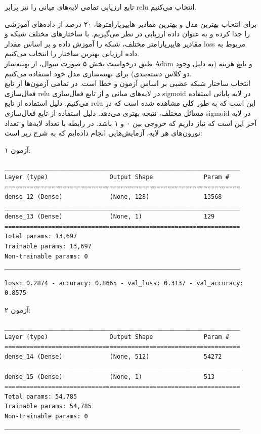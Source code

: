 \documentclass{article}
\begin{document}
تابع ارزیابی تمامی لایه‌های میانی را نیز برابر relu انتخاب می‌کنیم.

برای انتخاب بهترین مدل و بهترین مقادیر هایپرپارامترها، ۲۰ درصد از داده‌های آموزشی را جدا کرده و به عنوان داده ارزیابی در نظر می‌گیریم. با ساختارهای مختلف شبکه و مقادیر هایپرپارامتر مختلف، شبکه را آموزش داده و بر اساس مقدار  loss مربوط به داده ارزیابی بهترین ساختار را انتخاب می‌کنیم. \\

طبق درخواست بخش ۵ صورت سوال، از بهینه‌ساز Adam و تابع هزینه  (به دلیل وجود دو کلاس دسته‌بندی) برای بهینه‌سازی مدل خود استفاده می‌کنیم. \\

انتخاب ساختار شبکه عصبی بر اساس آزمون و خطا است. در تمامی آزمون‌ها از تابع فعال‌سازی relu در لایه‌های میانی و از تابع فعال‌سازی sigmoid در لایه پایانی استفاده می‌کنیم. دلیل استفاده از تابع relu این است که به طور کلی مشاهده شده است که در مسائل مختلف، نتیجه بهتری می‌دهد. دلیل استفاده از تابع فعال‌سازی sigmoid در لایه‌ آخر این است که نیاز داریم که خروجی بین ۰ و ۱ باشد. در رابطه با تعداد لایه‌ها و تعداد نورون‌های هر لایه، آزمایش‌هایی انجام داده‌ایم که به شرح زیر است:

آزمون ۱:

\begin{latin}
\begin{lstlisting}
_________________________________________________________________
Layer (type)                 Output Shape              Param #   
=================================================================
dense_12 (Dense)             (None, 128)               13568     
_________________________________________________________________
dense_13 (Dense)             (None, 1)                 129       
=================================================================
Total params: 13,697
Trainable params: 13,697
Non-trainable params: 0
_________________________________________________________________
\end{lstlisting}
\end{latin}


\begin{latin}
\begin{lstlisting}
loss: 0.2874 - accuracy: 0.8665 - val_loss: 0.3137 - val_accuracy: 0.8575
\end{lstlisting}
\end{latin}

آزمون ۲:

\begin{latin}
\begin{lstlisting}
_________________________________________________________________
Layer (type)                 Output Shape              Param #   
=================================================================
dense_14 (Dense)             (None, 512)               54272     
_________________________________________________________________
dense_15 (Dense)             (None, 1)                 513       
=================================================================
Total params: 54,785
Trainable params: 54,785
Non-trainable params: 0
_________________________________________________________________
\end{lstlisting}
\end{latin}
\end{document}
